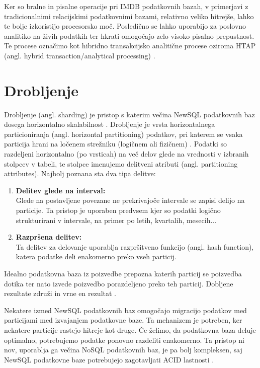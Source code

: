 \documentclass[a4paper, 12pt]{book}
\begin{document}
Ker so bralne in pisalne operacije pri IMDB podatkovnih bazah, v primerjavi z tradicionalnimi relacijskimi podatkovnimi bazami, relativno veliko hitrejše, lahko te bolje izkoristijo procesorsko moč. Posledično se lahko uporabijo za poslovno analitiko na živih podatkih ter hkrati omogočajo zelo visoko pisalno prepustnost. Te procese označimo kot hibridno transakcijsko analitične procese oziroma HTAP (angl. hybrid transaction/analytical processing) \cite{NewSqlInMemoryAnalytics}.


\section{Drobljenje}
Drobljenje (angl. sharding) je pristop s katerim večina NewSQL podatkovnih baz dosega horizontalno skalabilnost \cite{Pavlo2016Sep}. Drobljenje je vrsta horizontalnega particioniranja (angl. horizontal partitioning) podatkov, pri katerem se vsaka particija hrani na ločenem strežniku (logičnem ali fizičnem) \cite{WikiSharding}. Podatki so razdeljeni horizontalno (po vrsticah) na več delov glede na vrednosti v izbranih stolpcev v tabeli, te stolpce imenujemo delitveni atributi (angl. partitioning attributes). Najbolj poznana sta dva tipa delitve:

\begin{enumerate}
    \item \textbf{Delitev glede na interval:}\\Glede na postavljene povezane ne prekrivajoče intervale se zapisi delijo na particije. Ta pristop je uporaben predvsem kjer so podatki logično strukturirani v intervale, na primer po letih, kvartalih, mesecih...
    \item \textbf{Razpršena delitev:}\\Ta delitev za delovanje uporablja razpršitveno funkcijo (angl. hash function), katera podatke deli enakomerno preko vseh particij.
\end{enumerate}

Idealno podatkovna baza iz poizvedbe prepozna katerih particij se poizvedba dotika ter nato izvede poizvedbo porazdeljeno preko teh particij. Dobljene rezultate združi in vrne en rezultat \cite{Pavlo2016Sep}.

Nekatere izmed NewSQL podatkovnih baz omogočajo migracijo podatkov med particijami med izvajanjem podatkovne baze. Ta mehanizem je potreben, ker nekatere particije rastejo hitreje kot druge. Če želimo, da podatkovna baza deluje optimalno, potrebujemo podatke ponovno razdeliti enakomerno. Ta pristop ni nov, uporablja ga večina NoSQL podatkovnih baz, je pa bolj kompleksen, saj NewSQL podatkovne baze 
potrebujejo zagotavljati ACID lastnosti \cite{Pavlo2016Sep}.
\end{document}
